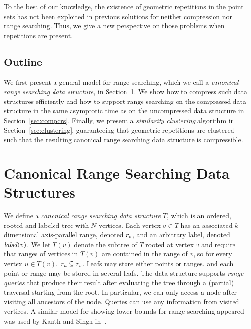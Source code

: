 To the best of our knowledge, the existence of geometric repetitions in the point sets has not been exploited in previous solutions for neither compression nor range searching. Thus, we give a new perspective on those problems when repetitions are present. 

\subsection{Outline}
We first present a general model for range searching, which we call a \emph{canonical range searching data structure}, in Section~\ref{sec:canrsds}. We show how to compress such data structures efficiently and how to support range searching on the compressed data structure in the same asymptotic time as on the uncompressed data structure in Section~\ref{sec:compcrs}. Finally, we present a \emph{similarity clustering} algorithm in Section~\ref{sec:clustering}, guaranteeing that geometric repetitions are clustered such that the resulting canonical range searching data structure is compressible.


\section{Canonical Range Searching Data Structures}\label{sec:canrsds}
We define a \emph{canonical range searching data structure} $T$, which is an ordered, rooted and labeled tree with $N$ vertices. Each vertex $v \in T$ has an associated $k$-dimensional axis-parallel range, denoted $\mathit{r_{v}}$, and an arbitrary label, denoted $\mathit{label}(v)$. We let $T(v)$ denote the subtree of $T$ rooted at vertex $v$ and require that ranges of vertices in $T(v)$ are contained in the range of $v$, so for every vertex $u \in T(v)$, $\mathit{r_{u}} \subseteq \mathit{r_{v}}$. Leafs may store either points or ranges, and each point or range may be stored in several leafs. The data structure supports \emph{range queries} that produce their result after evaluating the tree through a (partial) traversal starting from the root. In particular, we can only access a node after visiting all ancestors of the node. Queries can use any information from visited vertices. A similar model for showing lower bounds for range searching appeared was used by Kanth and Singh in~\cite{kanth1999optimal}.

